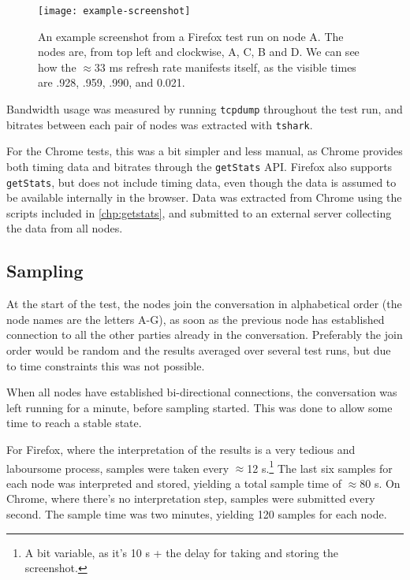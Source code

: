 \begin{figure}
    \centering
    \texttt{[image: example-screenshot]}
    \caption{An example screenshot from a Firefox test run on node A. The nodes are, from top left and clockwise, A, C, B and D. We can see how the $\approx$33 ms refresh rate manifests itself, as the visible times are .928, .959, .990, and 0.021.}
    \label{fig:example-screenshot}
\end{figure}

Bandwidth usage was measured by running \texttt{tcpdump} throughout the test run, and bitrates between each pair of nodes was extracted with \texttt{tshark}.

For the Chrome tests, this was a bit simpler and less manual, as Chrome provides both timing data and bitrates through the \texttt{getStats} API. Firefox also supports \texttt{getStats}, but does not include timing data, even though the data is assumed to be available internally in the browser. Data was extracted from Chrome using the scripts included in \autoref{chp:getstats}, and submitted to an external server collecting the data from all nodes.


\subsection{Sampling}

At the start of the test, the nodes join the conversation in alphabetical order (the node names are the letters A-G), as soon as the previous node has established connection to all the other parties already in the conversation. Preferably the join order would be random and the results averaged over several test runs, but due to time constraints this was not possible.

When all nodes have established bi-directional connections, the conversation was left running for a minute, before sampling started. This was done to allow some time to reach a stable state.

For Firefox, where the interpretation of the results is a very tedious and laboursome process, samples were taken every $\approx$12 s.\footnote{A bit variable, as it's 10 s + the delay for taking and storing the screenshot.} The last six samples for each node was interpreted and stored, yielding a total sample time of $\approx$80 s. On Chrome, where there's no interpretation step, samples were submitted every second. The sample time was two minutes, yielding 120 samples for each node.

